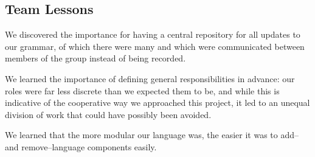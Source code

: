 \subsection{Team Lessons}
We discovered the importance for having a central repository for all
updates to our grammar, of which there were many and which were
communicated between members of the group instead of being recorded.

We learned the importance of defining general responsibilities in
advance: our roles were far less discrete than we expected them to be,
and while this is indicative of the cooperative way we approached this
project, it led to an unequal division of work that could have
possibly been avoided.  

We learned that the more modular our language was, the easier it was
to add--and remove--language components easily. 

